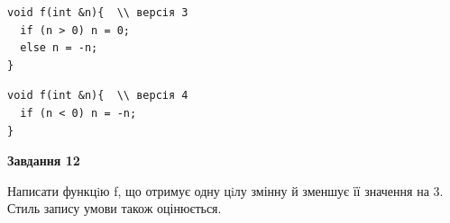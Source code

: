 \documentclass[12pt, ukrainian]{article}
\begin{document}
{\begin {large}
\begin{minipage}[t]{11.0cm}
\vspace{-8mm}\begin{verbatim}
void f(int &n){  \\ версія 3
  if (n > 0) n = 0;
  else n = -n;
}
\end{verbatim}

\vspace{-8mm}\begin{verbatim}
void f(int &n){  \\ версія 4
  if (n < 0) n = -n;
}
\end{verbatim}



\begin{center}
\textbf{Завдання 12}
\end{center}

Написати функцiю f, що отримує одну цiлу змінну й зменшує її значення на 3. Стиль запису умови також оцінюється.\par

\end{minipage}

\end {large}}
\newpage
\end{document}
